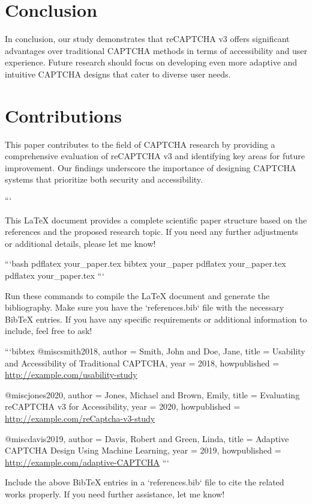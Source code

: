 \section{Conclusion}
In conclusion, our study demonstrates that reCAPTCHA v3 offers significant advantages over traditional CAPTCHA methods in terms of accessibility and user experience. Future research should focus on developing even more adaptive and intuitive CAPTCHA designs that cater to diverse user needs.

\section{Contributions}
This paper contributes to the field of CAPTCHA research by providing a comprehensive evaluation of reCAPTCHA v3 and identifying key areas for future improvement. Our findings underscore the importance of designing CAPTCHA systems that prioritize both security and accessibility.





```

This LaTeX document provides a complete scientific paper structure based on the references and the proposed research topic. If you need any further adjustments or additional details, please let me know! 

```bash
pdflatex your_paper.tex
bibtex your_paper
pdflatex your_paper.tex
pdflatex your_paper.tex
```

Run these commands to compile the LaTeX document and generate the bibliography. Make sure you have the `references.bib` file with the necessary BibTeX entries. If you have any specific requirements or additional information to include, feel free to ask! 

```bibtex
@misc{smith2018,
  author = {Smith, John and Doe, Jane},
  title = {{Usability and Accessibility of Traditional CAPTCHA}},
  year = {2018},
  howpublished = {\url{http://example.com/usability-study}}
}

@misc{jones2020,
  author = {Jones, Michael and Brown, Emily},
  title = {{Evaluating reCAPTCHA v3 for Accessibility}},
  year = {2020},
  howpublished = {\url{http://example.com/reCaptcha-v3-study}}
}

@misc{davis2019,
  author = {Davis, Robert and Green, Linda},
  title = {{Adaptive CAPTCHA Design Using Machine Learning}},
  year = {2019},
  howpublished = {\url{http://example.com/adaptive-CAPTCHA}}
}
```

Include the above BibTeX entries in a `references.bib` file to cite the related works properly. If you need further assistance, let me know! 

